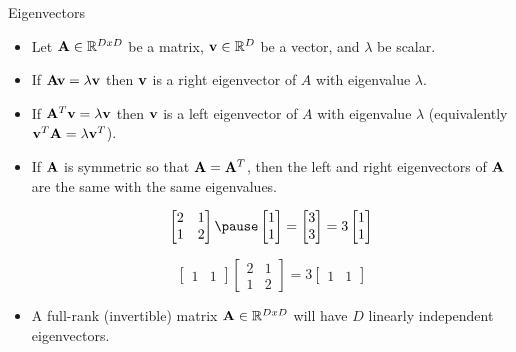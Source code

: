 \documentclass[serif,xcolor=pdftex,dvipsnames,table,hyperref={bookmarks=false,breaklinks}]{beamer}
\begin{document}
\begin{frame}[t]{Eigenvectors}
 
\begin{itemize}

\item Let ${\mathbf{A}}\in \mathbb{R}^{DxD}$ be a matrix, ${\mathbf{v}}\in 
\mathbb{R}^{D}$ be a vector, and $\lambda$ be scalar.

\pause\item If ${\mathbf{A}}{\mathbf{v}} = \lambda {\mathbf{v}}$ then ${\mathbf{v}}$ is a right 
eigenvector of $A$ with eigenvalue $\lambda$.

\pause\item If ${\mathbf{A}}^T{\mathbf{v}} = \lambda {\mathbf{v}}$ then ${\mathbf{v}}$ is a 
left eigenvector of $A$ with eigenvalue $\lambda$ (equivalently 
${\mathbf{v}}^T{\mathbf{A}} = \lambda {\mathbf{v}}^T$).

\pause\item If ${\mathbf{A}}$ is symmetric so that ${\mathbf{A}}={\mathbf{A}}^T$, then the 
left and right eigenvectors of ${\mathbf{A}}$ are the same with the same eigenvalues.

\pause
$$\begin{bmatrix}2&1\\1&2\end{bmatrix} 
\pause
\begin{bmatrix}1\\1\end{bmatrix} 
=\begin{bmatrix}3\\3\end{bmatrix}
=3\begin{bmatrix}1\\1\end{bmatrix}
$$

\pause
$$\begin{bmatrix}1 & 1\end{bmatrix} 
\begin{bmatrix}2 & 1\\ 1 & 2\end{bmatrix} 
=3\begin{bmatrix}1 & 1\end{bmatrix} 
$$

\pause\item A full-rank (invertible) matrix ${\mathbf{A}}\in 
\mathbb{R}^{DxD}$ will have $D$ linearly independent eigenvectors.

\end{itemize} 
\end{frame}
\end{document}
